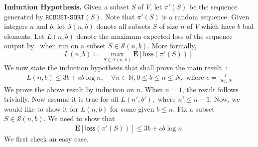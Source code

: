 \documentclass[11pt]{llncs}
\newcommand{\E}{\mathbf{E}}
\newcommand{\cS}{{\mathcal S}}
\newcommand{\loss}{{\textsf{loss}}}
\newcommand{\RS}{{\texttt{ROBUST-SORT}}}
\begin{document}
\noindent
{\bf{Induction Hypothesis.}} Given a subset $S$ of $V$, let $\pi'(S)$ be the sequence generated by $\RS(S)$. Note that $\pi'(S)$ is a random sequence. Given integers $n$ and $b$, let $\cS(n,b)$ denote all subsets $S$ of size $n$ of $V$ which have  $b$ bad elements. Let $L(n,b)$ denote the maximum expected loss of the sequence output by~ when run on a subset $S \in \cS(n, b)$. More formally, 
$$  L(n,b) \coloneqq \max_{S \in \cS(n,b)} \E[\loss(\pi'(S))].$$
We now state the induction hypothesis that shall prove the main result~:
\begin{align}
    \label{eq:IH}
  L(n,b) \leq 3 b + c b \log n, \quad \forall n \in \mathbb{N}, 0 \leq b \leq n \leq N, \mbox{ where } c = \frac{\varepsilon}{\log N}
\end{align}
We prove the above result by induction on $n$. When $n=1$, the result follows trivially. Now assume it is true for all $L(n',b'),$ where $n' \leq n-1$. Now, we would like to show it for $L(n,b)$ for some given $b \leq n$. Fix a subset $S \in \cS(n,b)$. We need to show that 
\begin{align}
    \label{eq:IH1}
    \E[\loss(\pi'(S))] \leq 3b + cb \log n.
\end{align}
We first check an easy case. 
\end{document}

